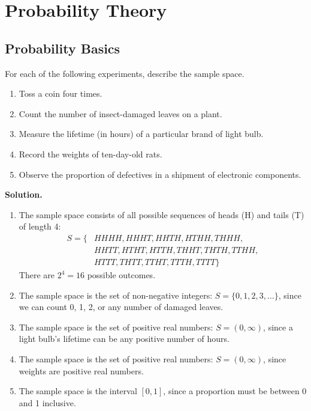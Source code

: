 \chapter{Probability Theory}

\section{Probability Basics}

\begin{problembox}
For each of the following experiments, describe the sample space.
\begin{enumerate}[label=(\alph*)]
    \item Toss a coin four times.
    \item Count the number of insect-damaged leaves on a plant.
    \item Measure the lifetime (in hours) of a particular brand of light bulb.
    \item Record the weights of ten-day-old rats.
    \item Observe the proportion of defectives in a shipment of electronic components.
\end{enumerate}

\end{problembox}

\noindent\textbf{Solution.}
\begin{enumerate}[label=(\alph*)]
    \item The sample space consists of all possible sequences of heads (H) and tails (T) of length 4:
    \begin{align*}
    S = \{&HHHH, HHHT, HHTH, HTHH, THHH, \\
    &HHTT, HTHT, HTTH, THHT, THTH, TTHH, \\
    &HTTT, THTT, TTHT, TTTH, TTTT\}
    \end{align*}
    There are $2^4 = 16$ possible outcomes.
    
    \item The sample space is the set of non-negative integers: $S = \{0, 1, 2, 3, \ldots\}$, since we can count 0, 1, 2, or any number of damaged leaves.
    
    \item The sample space is the set of positive real numbers: $S = (0, \infty)$, since a light bulb's lifetime can be any positive number of hours.
    
    \item The sample space is the set of positive real numbers: $S = (0, \infty)$, since weights are positive real numbers.
    
    \item The sample space is the interval $[0, 1]$, since a proportion must be between 0 and 1 inclusive.
\end{enumerate}

